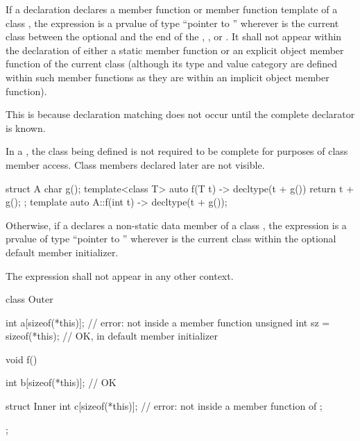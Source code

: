 \pnum
If a declaration declares a member function or member function template of a
class , the expression  is a prvalue of type ``pointer to
 ''
wherever  is the current class
between the optional
 and the end of the ,
, or . It shall not appear within
the declaration of either
a static member function or an explicit object member function
of the current class (although its type and value category
are defined within such member functions as they are within an implicit object
member function).
\begin{note}
This is because declaration matching does not
occur until the complete declarator is known.
\end{note}
\begin{note}
In a ,
the class being defined is not required to be complete
for purposes of class member access.
Class members declared later are not visible.
\begin{example}
\begin{codeblock}
struct A {
  char g();
  template<class T> auto f(T t) -> decltype(t + g())
    { return t + g(); }
};
template auto A::f(int t) -> decltype(t + g());
\end{codeblock}
\end{example}
\end{note}

\pnum
Otherwise, if a  declares a non-static data
member of a class , the expression  is
a prvalue of type ``pointer to ''
wherever  is the current class
within the
optional default member initializer.

\pnum
The expression  shall not appear in any other context.
\begin{example}
\begin{codeblock}
class Outer {
  int a[sizeof(*this)];                 // error: not inside a member function
  unsigned int sz = sizeof(*this);      // OK, in default member initializer

  void f() {
    int b[sizeof(*this)];               // OK

    struct Inner {
      int c[sizeof(*this)];             // error: not inside a member function of 
    };
  }
};
\end{codeblock}
\end{example}

